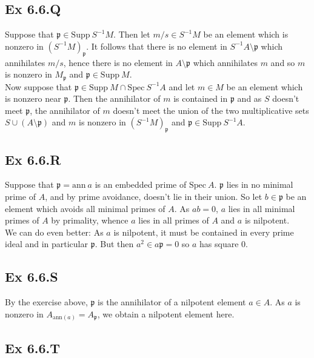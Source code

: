 \documentclass{article}
\theoremstyle{definition}
\newcommand{\Spec}{\text{Spec}}
\newcommand{\ann}{\text{ann}}
\newcommand{\Supp}{\text{Supp}}
\begin{document}
\subsection*{Ex 6.6.Q}

Suppose that $\mathfrak{p} \in \Supp\ S^{-1}M$. Then let $m/s \in S^{-1}M$ be
an element which is nonzero in $(S^{-1}M)_{\mathfrak{p}}$. It follows that
there is no element in $S^{-1}A \setminus \mathfrak{p}$ which annihilates
$m/s$, hence there is no element in $A \setminus \mathfrak{p}$ which
annihilates $m$ and so $m$ is nonzero in $M_{\mathfrak{p}}$ and $\mathfrak{p}
	\in \Supp\ M$. \\

Now suppose that $\mathfrak{p} \in \Supp\ M \cap \Spec\ S^{-1}A$ and let $m \in
	M$ be an element which is nonzero near $\mathfrak{p}$. Then the annihilator of
$m$ is contained in $\mathfrak{p}$ and as $S$ doesn't meet $\mathfrak{p}$, the
annihilator of $m$ doesn't meet the union of the two multiplicative sets $S
	\cup (A \setminus \mathfrak{p})$ and $m$ is nonzero in
$(S^{-1}M)_{\mathfrak{p}}$ and $\mathfrak{p} \in \Supp\ S^{-1}A$.

\subsection*{Ex 6.6.R}

Suppose that $\mathfrak{p} = \ann\ a$ is an embedded prime of $\Spec\ A$.
$\mathfrak{p}$ lies in no minimal prime of $A$, and by prime avoidance, doesn't
lie in their union. So let $b \in \mathfrak{p}$ be an element which avoids all
minimal primes of $A$. As $ab = 0$, $a$ lies in all minimal primes of $A$ by
primality, whence $a$ lies in all primes of $A$ and $a$ is nilpotent. \\

We can do even better: As $a$ is nilpotent, it must be contained in every prime
ideal and in particular $\mathfrak{p}$. But then $a^{2} \in a\mathfrak{p} = 0$
so $a$ has square $0$.

\subsection*{Ex 6.6.S}

By the exercise above, $\mathfrak{p}$ is the annihilator of a nilpotent element
$a \in A$. As $a$ is nonzero in $A_{\ann(a)} = A_{\mathfrak{p}}$, we obtain a
nilpotent element here.

\subsection*{Ex 6.6.T}
\end{document}
